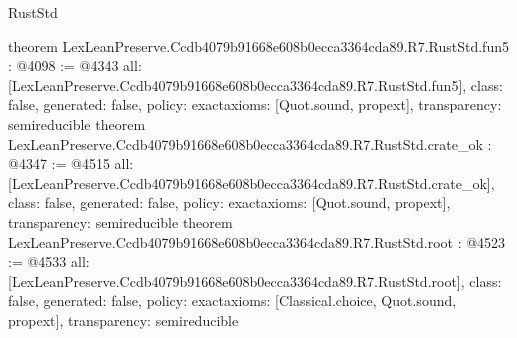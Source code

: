 \begin{lexlean}{RustStd}
\begin{coremodule}
{}
theorem LexLeanPreserve.Ccdb4079b91668e608b0ecca3364cda89.R7.RustStd.fun5 : @4098 := @4343 {
  all: [LexLeanPreserve.Ccdb4079b91668e608b0ecca3364cda89.R7.RustStd.fun5],
  class: false,
  generated: false,
  policy: exact{axioms: [Quot.sound, propext]},
  transparency: semireducible
}
theorem LexLeanPreserve.Ccdb4079b91668e608b0ecca3364cda89.R7.RustStd.crate_ok : @4347 := @4515 {
  all: [LexLeanPreserve.Ccdb4079b91668e608b0ecca3364cda89.R7.RustStd.crate_ok],
  class: false,
  generated: false,
  policy: exact{axioms: [Quot.sound, propext]},
  transparency: semireducible
}
theorem LexLeanPreserve.Ccdb4079b91668e608b0ecca3364cda89.R7.RustStd.root : @4523 := @4533 {
  all: [LexLeanPreserve.Ccdb4079b91668e608b0ecca3364cda89.R7.RustStd.root],
  class: false,
  generated: false,
  policy: exact{axioms: [Classical.choice, Quot.sound, propext]},
  transparency: semireducible
}


\end{coremodule}
\end{lexlean}
